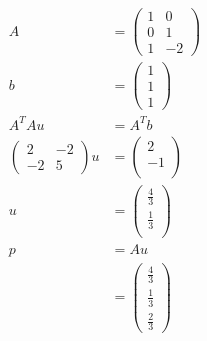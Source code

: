 \documentclass[12pt]{article}
\newenvironment{problem}[2][Problem]{\begin{trivlist}
\item[\hskip \labelsep {\bfseries #1}\hskip \labelsep {\bfseries #2.}]}{\end{trivlist}}
\begin{document}
\begin{problem}{3.b.ii}
\end{problem}
\begin{align*}
A &= \left( \begin{array}{cc}
1 & 0\\
0 & 1\\
1 & -2
\end{array} \right) \\
b &= \left( \begin{array}{cc}
1\\
1\\
1
\end{array} \right) \\
A^TAu &= A^Tb\\
\left( \begin{array}{ccc}
2 & -2\\
-2 & 5
\end{array} \right) u &=
\left( \begin{array}{c}
2\\
-1\\
\end{array} \right) \\
u &= \left( \begin{array}{c}
\frac{4}{3}\\
\frac{1}{3}\\
\end{array} \right) \\
p &= Au\\
&= \left( \begin{array}{cc}
\frac{4}{3}\\
\frac{1}{3}\\
\frac{2}{3}
\end{array} \right)
\end{align*}
\end{document}
